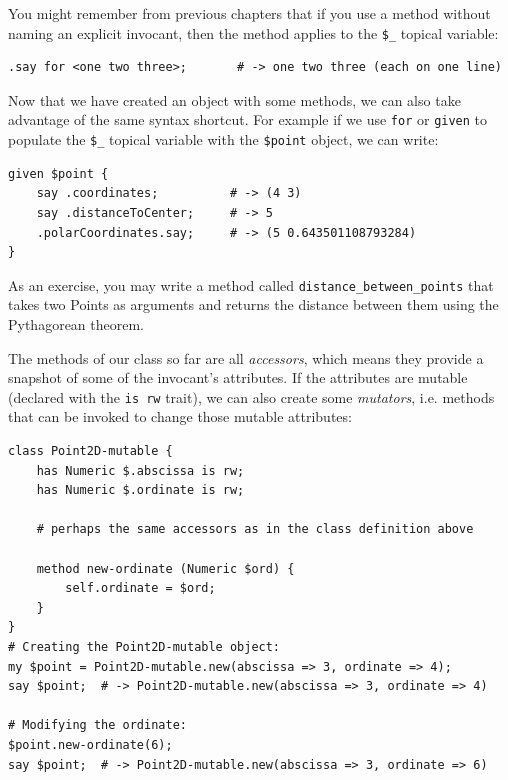 You might remember from previous chapters that if you use a method 
without naming an explicit invocant, then the method applies to 
the \verb'$_' topical variable:

\begin{verbatim}
.say for <one two three>;       # -> one two three (each on one line)
\end{verbatim}

Now that we have created an object with some methods, we can also 
take advantage of the same syntax shortcut. For example if we 
use {\tt for} or {\tt given} to populate the \verb'$_' topical 
variable with the \verb'$point' object, we can write:

\begin{verbatim}
given $point {
    say .coordinates;          # -> (4 3)                       
    say .distanceToCenter;     # -> 5                 
    .polarCoordinates.say;     # -> (5 0.643501108793284)
}    
\end{verbatim}

As an exercise, you may write a method called 
\verb"distance_between_points" that takes two Points 
as arguments and returns the distance between
them using the Pythagorean theorem.

The methods of our class so far are all \emph{accessors}, which 
means they provide a snapshot of some of the invocant's attributes. 
If the attributes are mutable (declared with the \verb'is rw' 
trait), we can also create some \emph{mutators}, i.e. methods 
that can be invoked to change those mutable attributes:

\begin{verbatim}
class Point2D-mutable {
    has Numeric $.abscissa is rw;
    has Numeric $.ordinate is rw;
    
    # perhaps the same accessors as in the class definition above
    
    method new-ordinate (Numeric $ord) {
        self.ordinate = $ord; 
    }
}
# Creating the Point2D-mutable object:
my $point = Point2D-mutable.new(abscissa => 3, ordinate => 4);
say $point;  # -> Point2D-mutable.new(abscissa => 3, ordinate => 4)

# Modifying the ordinate:
$point.new-ordinate(6);
say $point;  # -> Point2D-mutable.new(abscissa => 3, ordinate => 6)
\end{verbatim}




